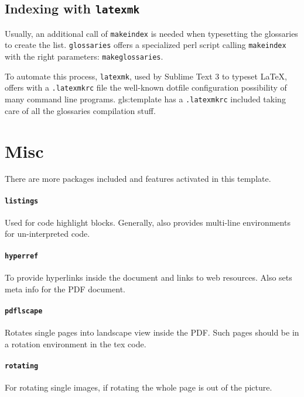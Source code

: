 \subsection{Indexing with \texttt{latexmk}} %
\label{sub:indexing_with_latexmk}
Usually, an additional call of \texttt{makeindex} is needed when typesetting the glossaries to create the list. \texttt{glossaries}	offers a specialized perl script calling \texttt{makeindex} with the right parameters: \texttt{makeglossaries}.

To automate this process, \texttt{latexmk}, used by Sublime Text 3 to typeset \LaTeX, offers with a \texttt{.latexmkrc} file the well-known dotfile configuration possibility of many command line programs. \Gls{gls:template} has a \texttt{.latexmkrc} included taking care of all the glossaries compilation stuff.

\section{Misc} %
\label{sec:misc}
There are more packages included and features activated in this template.
\paragraph{\texttt{listings}} %
\label{par:listings}
Used for code highlight blocks. Generally, also provides multi-line environments for un-interpreted code.
\paragraph{\texttt{hyperref}} %
\label{par:hyperref}
To provide hyperlinks inside the document and links to web resources. Also sets meta info for the PDF document.
\paragraph{\texttt{pdflscape}} %
\label{par:pdflscape}
Rotates single pages into landscape view inside the PDF. Such pages should be in a rotation environment in the tex code.
\paragraph{\texttt{rotating}} %
\label{par:rotating}
For rotating single images, if rotating the whole page is out of the picture.
